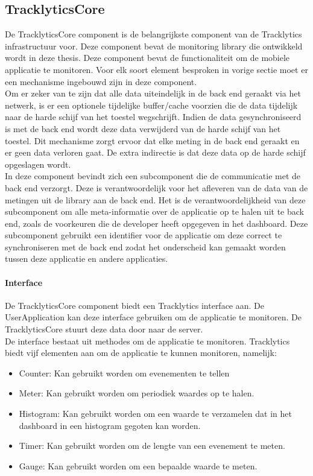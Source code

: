 \subsection{TracklyticsCore}
De TracklyticsCore component is de belangrijkste component van de Tracklytics infrastructuur voor. Deze component bevat de monitoring library die ontwikkeld wordt in deze thesis. Deze component bevat de functionaliteit om de mobiele applicatie te monitoren. Voor elk soort element besproken in vorige sectie moet er een mechanisme ingebouwd zijn in deze component. \\

Om er zeker van te zijn dat alle data uiteindelijk in de back end geraakt via het netwerk, is er een optionele tijdelijke buffer/cache voorzien die de data tijdelijk naar de harde schijf van het toestel wegschrijft. Indien de data gesynchroniseerd is met de back end wordt deze data verwijderd van de harde schijf van het toestel. Dit mechanisme zorgt ervoor dat elke meting in de back end geraakt en er geen data verloren gaat. De extra indirectie is dat deze data op de harde schijf opgeslagen wordt. \\

In deze component bevindt zich een subcomponent die de communicatie met de back end verzorgt. Deze is verantwoordelijk voor het afleveren van de data van de metingen uit de library aan de back end. Het is de verantwoordelijkheid van deze subcomponent om alle meta-informatie over de applicatie op te halen uit te back end, zoals de voorkeuren die de developer heeft opgegeven in het dashboard. Deze subcomponent gebruikt een identifier voor de applicatie om deze correct te synchroniseren met de back end zodat het onderscheid kan gemaakt worden tussen deze applicatie en andere applicaties. 


\paragraph{Interface}
De TracklyticsCore component biedt een Tracklytics interface aan. De UserApplication kan deze interface gebruiken om de applicatie te monitoren. De TracklyticsCore stuurt deze data door naar de server.\\

De interface bestaat uit methodes om de applicatie te monitoren. Tracklytics biedt vijf elementen aan om de applicatie te kunnen monitoren, namelijk:
\begin{itemize}
\item Counter: Kan gebruikt worden om evenementen te tellen
\item Meter: Kan gebruikt worden om periodiek waardes op te halen.
\item Histogram: Kan gebruikt worden om een waarde te verzamelen dat in het dashboard in een histogram gegoten kan worden. 
\item Timer: Kan gebruikt worden om de lengte van een evenement te meten.
\item Gauge: Kan gebruikt worden om een bepaalde waarde te meten. 
\end{itemize}

